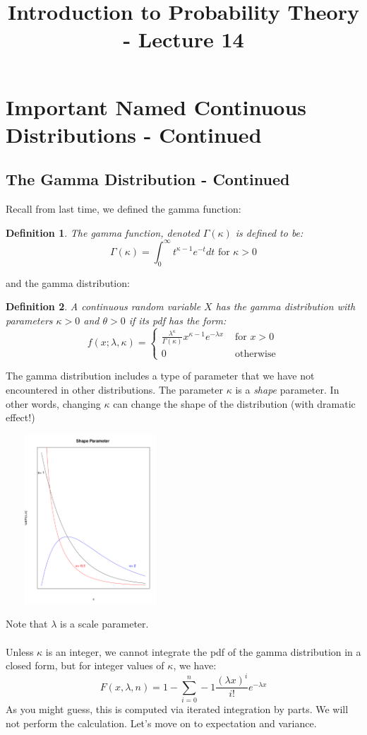 \documentclass[12pt]{article} %
\title{Introduction to Probability Theory - Lecture 14}
\newtheorem{defn}{Definition}
\begin{document}
\maketitle

\section{Important Named Continuous Distributions - Continued}
\subsection{The Gamma Distribution - Continued}
Recall from last time, we defined the gamma function: 
\begin{defn}
The gamma function, denoted $\Gamma(\kappa)$ is defined to be:
$$\Gamma(\kappa) = \int_0^{\infty} t^{\kappa -1} e^{-t} dt \textrm{ for } \kappa >0$$
\end{defn}
and the gamma distribution:
\begin{defn}
A continuous random variable $X$ has the gamma distribution with parameters $\kappa>0$ and $\theta>0$ if its pdf has the form:
$$f(x;\lambda,\kappa) = \left\{\begin{matrix}
\frac{\lambda^\kappa}{\Gamma(\kappa)}x^{\kappa-1} e^{-\lambda x} & \textrm{ for } x>0\\0&\textrm{ otherwise}\end{matrix}\right.$$
\end{defn}
The gamma distribution includes a type of parameter that we have not encountered in other distributions. The parameter $\kappa$ is a \emph{shape} parameter. In other words, changing $\kappa$ can change the shape of the distribution (with dramatic effect!)

\includegraphics[height=2.5in,width=2.5in]{shape.pdf}

Note that $\lambda$ is a scale parameter.\\\\
Unless $\kappa$ is an integer, we cannot integrate the pdf of the gamma distribution in a closed form, but for integer values of $\kappa$, we have:
$$F(x,\lambda,n) = 1-\sum_{i=0}^n-1 \frac{\left(\lambda x\right)^i}{i!} e^{-\lambda x}$$
As you might guess, this is computed via iterated integration by parts. We will not perform the calculation. Let's move on to expectation and variance.
\end{document}
